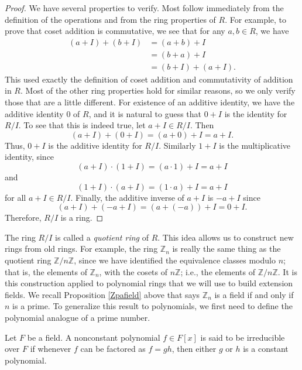 \begin{proof}
We have several properties to verify. Most follow immediately from the
definition of the operations and from the ring properties of $R$. For example,
to prove that coset addition is commutative, we see that for any $a,b\in R$,
we have
\begin{align*}
\left(  a+I\right)  +\left(  b+I\right)   & =(a+b)+I\\
& =(b+a)+I\\
& =\left(  b+I\right)  +\left(  a+I\right)  .
\end{align*}
This used exactly the definition of coset addition and commutativity of
addition in $R$. Most of the other ring properties hold for similar reasons,
so we only verify those that are a little different. For existence of an
additive identity, we have the additive identity $0$ of $R$, and it is natural
to guess that $0+I$ is the identity for $R/I$. To see that this is indeed
true, let $a+I\in R/I$. Then
\[
\left(  a+I\right)  +\left(  0+I\right)  =(a+0)+I=a+I.
\]
Thus, $0+I$ is the additive identity for $R/I$. Similarly $1+I$ is the
multiplicative identity, since
\[
\left(  a+I\right)  \cdot\left(  1+I\right)  =(a\cdot1)+I=a+I
\]
and
\[
\left(  1+I\right)  \cdot\left(  a+I\right)  =(1\cdot a)+I=a+I
\]
for all $a+I\in R/I$. Finally, the additive inverse of $a+I$ is $-a+I$ since
\[
\left(  a+I\right)  +\left(  -a+I\right)  =(a+(-a))+I=0+I.
\]
Therefore, $R/I$ is a ring.
\end{proof}


The ring $R/I$ is called a
%
\emph{quotient ring} of $R$. This idea allows us to construct new rings from
old rings. For example, the ring $\mathbb{Z}_{n}$ is really the same thing as
the quotient ring $\mathbb{Z}/n\mathbb{Z}$, since we have identified the
equivalence classes modulo $n$; that is, the elements of $\mathbb{Z}_{n}$,
with the cosets of $n\mathbb{Z}$; i.e., the elements of $\mathbb{Z}%
/n\mathbb{Z}$. It is this construction applied to polynomial rings that we
will use to build extension fields. We recall Proposition \ref{Zpafield} above
that says $\mathbb{Z}_{n}$ is a field if and only if $n$ is a prime. To
generalize this result to polynomials, we first need to define the polynomial
analogue of a prime number.

\begin{definition}%
%
Let $F$ be a field. A nonconstant polynomial $f\in F[x]$ is said to be
irreducible over $F$ if whenever $f$ can be factored as $f=gh$, then either
$g$ or $h$ is a constant polynomial.
\end{definition}

